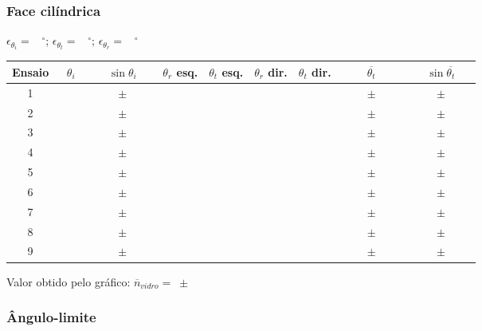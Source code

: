 \documentclass[a4paper,12pt]{article}  %
\begin{document}
\subsubsection{\sf Face cilíndrica}


$\epsilon_{\theta_i}=$~\underline{\makebox[1cm][r]{~}} $^\circ$; 
$\epsilon_{\theta_t}=$~\underline{\makebox[1cm][r]{~}} $^\circ$;
$\epsilon_{\theta_r}=$~\underline{\makebox[1cm][r]{~}} $^\circ$


\begin{center}
	\begin{tabular}{|c|c|c|c|c|c|c|c|c|}
	\hline
	 Ensaio   &  $\theta_i $  & $\sin\theta_i$  &  $\theta_r $ esq.  & $\theta_t $ esq.  & $\theta_r $ dir.  & $\theta_t $ dir. & $\overline{\theta_t }$  & $\sin\overline{\theta_t}$ \\
	\hline \hline
	 1 & $\qquad$ & $\qquad\pm\qquad$ & & & & & $\qquad\pm\qquad$ & $\qquad\pm\qquad$   \\\cline{1-9}
	 2 & & $\quad\pm\quad$ & & & & & $\quad\pm\quad$ & $\quad\pm\quad$   \\\cline{1-9}
	 3 & & $\quad\pm\quad$ & & & & & $\quad\pm\quad$ & $\quad\pm\quad$   \\\cline{1-9}
	 4 & & $\quad\pm\quad$ & & & & & $\quad\pm\quad$ & $\quad\pm\quad$   \\\cline{1-9}
	 5 & & $\quad\pm\quad$ & & & & & $\quad\pm\quad$ & $\quad\pm\quad$   \\\cline{1-9}
	 6 & & $\quad\pm\quad$ & & & & & $\quad\pm\quad$ & $\quad\pm\quad$   \\\cline{1-9}
	 7 & & $\quad\pm\quad$ & & & & & $\quad\pm\quad$ & $\quad\pm\quad$   \\\cline{1-9}
	 8 & & $\quad\pm\quad$ & & & & & $\quad\pm\quad$ & $\quad\pm\quad$   \\\cline{1-9}
	 9 & & $\quad\pm\quad$ & & & & & $\quad\pm\quad$ & $\quad\pm\quad$   \\
	  \hline
	\end{tabular}
\end{center}

Valor obtido pelo gráfico: $\overline{n}_{vidro} =$~\underline{\makebox[2cm][r]{~}}$\pm$~\underline{\makebox[2cm][r]{~}}


\subsubsection{\sf Ângulo-limite}
\end{document}
